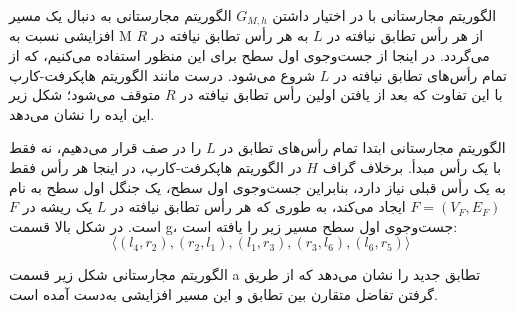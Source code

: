 \begin{itemframe}{الگوریتم مجارستانی}
\decLineSpace[0mm]
\itm
با در اختیار داشتن $G_{M,h}$ الگوریتم مجارستانی به دنبال یک مسیر افزایشی نسبت به M از هر رأس تطابق نیافته در $L$ به هر رأس تطابق نیافته در $R$ می‌گردد.
\itm
در اینجا از جست‌وجوی اول سطح برای این منظور استفاده می‌کنیم، که از تمام رأس‌های تطابق نیافته در $L$ شروع می‌شود. درست مانند الگوریتم هاپکرفت-کارپ با این تفاوت که بعد از یافتن اولین رأس تطابق نیافته در $R$ متوقف می‌شود؛ شکل زیر این ایده را نشان می‌دهد.

\end{itemframe}


\begin{itemframe}{الگوریتم مجارستانی}
\itm
ابتدا تمام رأس‌های تطابق در $L$ را در صف قرار می‌دهیم، نه فقط با یک رأس مبدأ.
برخلاف گراف $H$ در الگوریتم هاپکرفت-کارپ، در اینجا هر رأس فقط به یک رأس قبلی نیاز دارد، بنابراین جست‌وجوی اول سطح، یک جنگل اول سطح
به نام $F = (V_F, E_F)$ ایجاد می‌کند، به طوری که هر رأس تطابق نیافته در $L$ یک ریشه در $F$ است.
\itm
در شکل بالا قسمت g، جست‌وجوی اول سطح مسیر زیر را یافته است:
$$
\langle (l_4, r_2), (r_2, l_1), (l_1, r_3), (r_3, l_6), (l_6, r_5) \rangle
$$

\end{itemframe}


\begin{itemframe}{الگوریتم مجارستانی}
\itm
شکل زیر قسمت a تطابق جدید را نشان می‌دهد که از طریق گرفتن تفاضل متقارن بین تطابق و این مسیر افزایشی به‌دست آمده است.
\end{itemframe}
